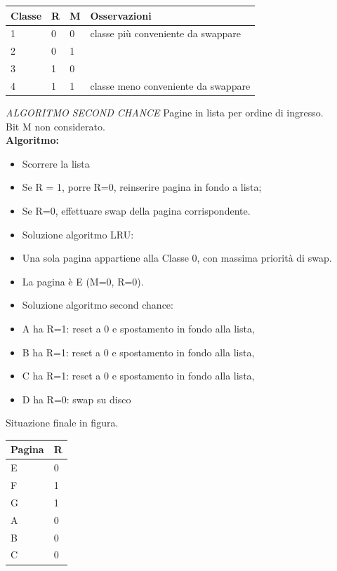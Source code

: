 \documentclass{article}
\begin{document}
\vskip 0.5cm

 \begin{tabular}{|p{}|p{}|p{}|p{}|}
\hline
Classe         & R        & M          & Osservazioni \\
\hline
1            & 0     & 0               & classe più conveniente da swappare  \\
2            & 0     & 1                 &  \\
3            & 1     & 0                 & \\
4            & 1     & 1                &   classe meno conveniente da swappare \\
\hline
\end{tabular}


\vskip 0.5cm


\textit{ALGORITMO SECOND CHANCE}
 Pagine in lista per ordine di ingresso.\\
 Bit M non considerato.\\
 \vskip 0.3cm
 \textbf{Algoritmo:}
\begin{itemize}
\item  Scorrere la lista
\item  Se R = 1, porre R=0, reinserire pagina in fondo a lista;
\item  Se R=0, effettuare swap della pagina corrispondente.
\item  Soluzione algoritmo LRU:
\item  Una sola pagina appartiene alla Classe 0, con massima priorità di swap.
\item  La pagina è E (M=0, R=0).
\item  Soluzione algoritmo second chance:
\item  A ha R=1: reset a 0 e spostamento in fondo alla lista,
\item  B ha R=1: reset a 0 e spostamento in fondo alla lista,
\item  C ha R=1: reset a 0 e spostamento in fondo alla lista,
\item  D ha R=0: swap su disco
\end{itemize}
Situazione finale in figura.

\vskip 0.3cm

\begin{tabular}{|p{}|p{}|}
\hline
Pagina         & R                \\
\hline
E                 & 0                 \\
F                 & 1                  \\
G                 & 1                  \\
A                 & 0                    \\
B                 & 0                   \\
C                 & 0                   \\
\hline
\end{tabular}
\end{document}
